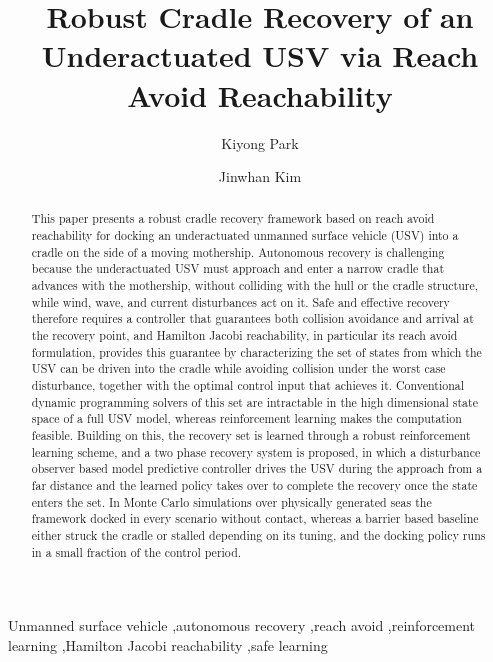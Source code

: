 \documentclass[5p,times,authoryear]{elsarticle}
\begin{document}
\begin{frontmatter}
\dochead{}

\title{Robust Cradle Recovery of an Underactuated USV via Reach Avoid Reachability}

\author{Kiyong Park}
\author{Jinwhan Kim}
\address{Department of Mechanical Engineering, Korea Advanced Institute of Science and Technology (KAIST), Daejeon 34141, Republic of Korea}

\begin{abstract}
This paper presents a robust cradle recovery framework based on reach avoid reachability for docking an underactuated unmanned surface vehicle (USV) into a cradle on the side of a moving mothership. Autonomous recovery is challenging because the underactuated USV must approach and enter a narrow cradle that advances with the mothership, without colliding with the hull or the cradle structure, while wind, wave, and current disturbances act on it. Safe and effective recovery therefore requires a controller that guarantees both collision avoidance and arrival at the recovery point, and Hamilton Jacobi reachability, in particular its reach avoid formulation, provides this guarantee by characterizing the set of states from which the USV can be driven into the cradle while avoiding collision under the worst case disturbance, together with the optimal control input that achieves it. Conventional dynamic programming solvers of this set are intractable in the high dimensional state space of a full USV model, whereas reinforcement learning makes the computation feasible. Building on this, the recovery set is learned through a robust reinforcement learning scheme, and a two phase recovery system is proposed, in which a disturbance observer based model predictive controller drives the USV during the approach from a far distance and the learned policy takes over to complete the recovery once the state enters the set. In Monte Carlo simulations over physically generated seas the framework docked in every scenario without contact, whereas a barrier based baseline either struck the cradle or stalled depending on its tuning, and the docking policy runs in a small fraction of the control period.
\end{abstract}

\begin{keyword}
Unmanned surface vehicle \sep autonomous recovery \sep reach avoid \sep reinforcement learning \sep Hamilton Jacobi reachability \sep safe learning
\end{keyword}

\end{frontmatter}
\end{document}
